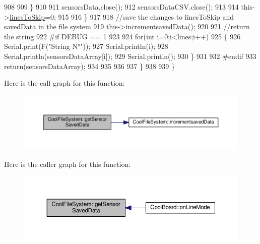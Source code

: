 \begin{DoxyCode}
908 
909             \}
910 
911             sensorsData.close();
912             sensorsDataCSV.close();
913             
914             this->\hyperlink{class_cool_file_system_a84fdb6057e534b395512463daa28ea3c}{linesToSkip}=0;
915         
916         \}
917 
918         \textcolor{comment}{//save the changes to linesToSkip and savedData in the file system}
919         this->\hyperlink{class_cool_file_system_aae045125288f255f3e258073dcada2a6}{incrementsavedData}();
920 
921         \textcolor{comment}{//return the string}
922 \textcolor{preprocessor}{        #if DEBUG == 1}
923         
924             \textcolor{keywordflow}{for}(\textcolor{keywordtype}{int} i=0;i<lines;i++)
925             \{
926                 Serial.print(F(\textcolor{stringliteral}{"String N°"}));
927                 Serial.println(i);
928                 Serial.println(sensorsDataArray[i]);
929                 Serial.println();           
930             \}
931     
932 \textcolor{preprocessor}{        #endif}
933         \textcolor{keywordflow}{return}(sensorsDataArray);
934         
935         
936         
937     \}
938 
939 \}
\end{DoxyCode}
Here is the call graph for this function\+:\nopagebreak
\begin{figure}[H]
\begin{center}
\leavevmode
\includegraphics[width=350pt]{db/d0c/class_cool_file_system_a3223ffff4266a6300988fab956d6b4b2_cgraph}
\end{center}
\end{figure}
Here is the caller graph for this function\+:\nopagebreak
\begin{figure}[H]
\begin{center}
\leavevmode
\includegraphics[width=350pt]{db/d0c/class_cool_file_system_a3223ffff4266a6300988fab956d6b4b2_icgraph}
\end{center}
\end{figure}
\mbox{\label{class_cool_file_system_aae045125288f255f3e258073dcada2a6}} 

